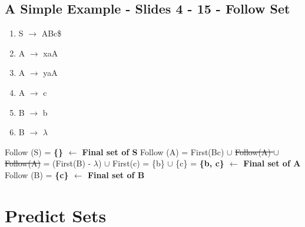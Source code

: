 \documentclass{report}
\begin{document}
\subsection{A Simple Example - Slides 4 - 15 - Follow Set}
\vspace{-1em}
\begin{multicols}{2}
  \begin{enumerate}
    \setlength\itemsep{-.25em}
    \item S $\rightarrow$ ABc\$
    \item A $\rightarrow$ xaA
    \item A $\rightarrow$ yaA
    \item A $\rightarrow$ c
    \item B $\rightarrow$ b
    \item B $\rightarrow$ $\lambda$\newline
  \end{enumerate}
  \setlength{\leftskip}{-12em}
Follow (S) = \textbf{ \{\} $\leftarrow$ Final set of S}\newline
Follow (A) = First(Bc) $\cup$ \st{Follow(A) $\cup$ Follow(A)}\newline
\indent\hspace{1.25cm}= (First(B) - $\lambda$) $\cup$ First(c)\newline
\indent\hspace{1.25cm}= \{b\} $\cup$ \{c\} = \textbf{ \{b, c\} $\leftarrow$ Final set of A}\newline
Follow (B) = \textbf{ \{c\} $\leftarrow$ Final set of B}\newline  
\end{multicols}


\section{Predict Sets}
\end{document}
